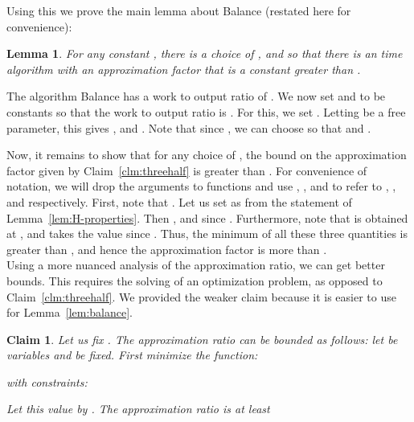 \documentclass[11pt]{article}
\newtheorem{Lem}[theorem]{Lemma}
\newtheorem{claim}[theorem]{Claim}
\newenvironment{myproof}{\noindent {\sc Proof:}}{}
\newcommand\Balance{{\sc Balance}\xspace}
\begin{document}
Using this we prove the main lemma about {\Balance} (restated here
for convenience):

\begin{Lem}
For any constant , there is a choice of ,  and
 so that there is an  time algorithm with an
approximation factor that is a constant greater than .
\end{Lem}

\begin{myproof}
The algorithm {\Balance} has a work to output ratio of
. We now set  and
 to be constants so that the work to output ratio is . For
this, we set . Letting 
be a free parameter, this gives , and . Note that since , we can choose  so that  and .

Now, it remains to show that for any choice of , the bound on
the approximation factor given by Claim~\ref{clm:threehalf} is greater than
. For convenience of notation, we will drop the arguments to functions and
use , , and  to refer to , , and
 respectively. First, note that . Let us set
 as from the statement of
Lemma~\ref{lem:H-properties}. Then , and  since . Furthermore, note that
 is obtained
at , and takes the value  since . Thus, the minimum of all these three
quantities is greater than , and hence the approximation factor is more
than .
\end{myproof}\\

Using a more nuanced analysis of the approximation ratio, we can
get better bounds. This requires the solving of an optimization
problem, as opposed to Claim~\ref{clm:threehalf}. We provided
the weaker claim because it is easier to use for Lemma~\ref{lem:balance}.


\begin{claim} \label{clm:lp} Let us fix . The approximation ratio
can be bounded as follows: let  be variables and  be
fixed. First minimize the function:

with constraints:

Let this value by . The approximation ratio is at least

\end{claim}
\end{document}
